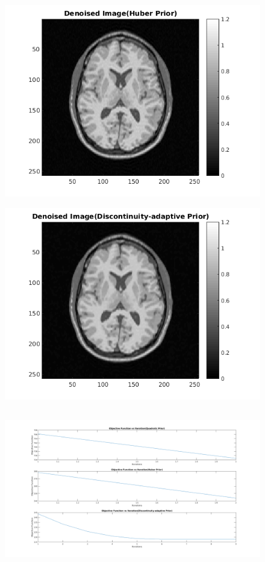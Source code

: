 \documentclass[11pt]{article}
\begin{document}
\begin{figure}[h]
\centering
\includegraphics[scale=0.7]{DenoisedHuber}
\end{figure}

\begin{figure}[h]
\includegraphics[scale=0.7]{DenoisedDA}
\centering
\end{figure}
\FloatBarrier


\subsection{}
\begin{figure}[h]
\hspace*{-1.5in}
\includegraphics[scale=0.48]{graphs}
\centering
\end{figure}
\FloatBarrier
\end{document}
